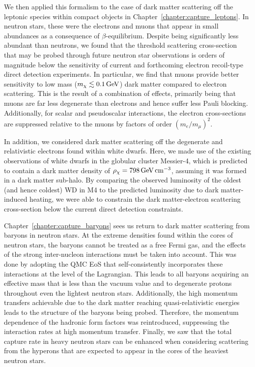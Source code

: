 We then applied this formalism to the case of dark matter scattering off the leptonic species within compact objects in Chapter~\ref{chapter:capture_leptons}. In neutron stars, these were the electrons and muons that appear in small abundances as a consequence of $\beta$-equilibrium. Despite being significantly less abundant than neutrons, we found that the threshold scattering cross-section that may be probed through future neutron star observations is orders of magnitude below the sensitivity of current and forthcoming electron recoil-type direct detection experiments.
In particular, we find that muons provide better sensitivity to low mass ($m_\chi\lesssim 0.1{\rm \,GeV}$) dark matter compared to electron scattering. This is the result of a combination of effects, primarily being that muons are far less degenerate than electrons and hence suffer less Pauli blocking. Additionally, for scalar and pseudoscalar interactions, the electron cross-sections are suppressed relative to the muons by factors of order  $(m_e/m_\mu)^2$. 

In addition, we considered dark matter scattering off the degenerate and relativistic electrons found within white dwarfs.  Here, we made use of the existing observations of white dwarfs in the globular cluster Messier-4, which is predicted to contain a dark matter density of $\rho_\chi = 798{\rm \,GeV} {\rm \,cm}^{-3}$, assuming it was formed in a dark matter sub-halo. By comparing the observed luminosity of the oldest (and hence coldest) WD in M4 to the predicted luminosity due to dark matter-induced heating, we were able to constrain the dark matter-electron scattering cross-section below the current direct detection constraints. 

Chapter~\ref{chapter:capture_baryons} sees us return to dark matter scattering from baryons in neutron stars. At the extreme densities found within the cores of neutron stars, the baryons cannot be treated as a free Fermi gas, and the effects of the strong inter-nucleon interactions must be taken into account. This was done by adopting the QMC EoS that self-consistently incorporates these interactions at the level of the Lagrangian. This leads to all baryons acquiring an effective mass that is less than the vacuum value and to degenerate protons throughout even the lightest neutron stars. Additionally, the high momentum transfers achievable due to the dark matter reaching quasi-relativistic energies leads to the structure of the baryons being probed. Therefore, the momentum dependence of the hadronic form factors was reintroduced, suppressing the interaction rates at high momentum transfer. Finally, we saw that the total capture rate in heavy neutron stars can be enhanced when considering scattering from the hyperons that are expected to appear in the cores of the heaviest neutron stars. 

